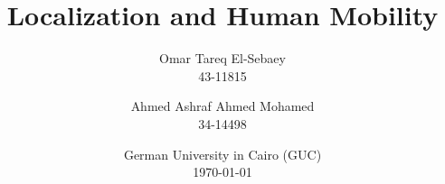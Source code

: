 \documentclass[11pt, a4paper, english]{report}
\title{Localization and Human Mobility}
\author{Omar Tareq El-Sebaey \\ 43-11815 \and Ahmed Ashraf Ahmed Mohamed \\ 34-14498}
\date{German University in Cairo (GUC) \\ \today}
\begin{document}
\begin{titlepage}
    \maketitle
    \begin{abstract}
        \textcolor{red}{\blindtext[1]}
    \end{abstract}
    \tableofcontents
\end{titlepage}





\printacronyms[pages={display=all,seq/use=false}]


\end{document}
